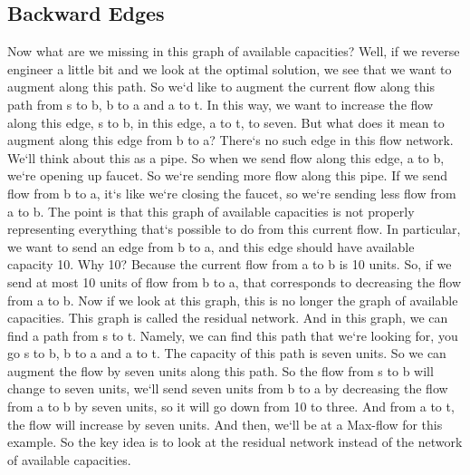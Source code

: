 \subsection{Backward Edges}
Now what are we missing in this graph of available capacities? Well, if we reverse engineer a little bit and we look at the optimal solution, we see that we want to augment along this path.
So we`d like to augment the current flow along this path from s to b, b to a and a to t.
In this way, we want to increase the flow along this edge, s to b, in this edge, a to t, to seven.
But what does it mean to augment along this edge from b to a? There`s no such edge in this flow network.
We`ll think about this as a pipe.
So when we send flow along this edge, a to b, we`re opening up faucet.
So we`re sending more flow along this pipe.
If we send flow from b to a, it`s like we`re closing the faucet, so we`re sending less flow from a to b.
The point is that this graph of available capacities is not properly representing everything that`s possible to do from this current flow.
In particular, we want to send an edge from b to a, and this edge should have available capacity 10.
Why 10? Because the current flow from a to b is 10 units.
So, if we send at most 10 units of flow from b to a, that corresponds to decreasing the flow from a to b.
Now if we look at this graph, this is no longer the graph of available capacities.
This graph is called the residual network.
And in this graph, we can find a path from s to t.
Namely, we can find this path that we`re looking for, you go s to b, b to a and a to t.
The capacity of this path is seven units.
So we can augment the flow by seven units along this path.
So the flow from s to b will change to seven units, we`ll send seven units from b to a by decreasing the flow from a to b by seven units, so it will go down from 10 to three.
And from a to t, the flow will increase by seven units.
And then, we`ll be at a Max-flow for this example.
So the key idea is to look at the residual network instead of the network of available capacities.


